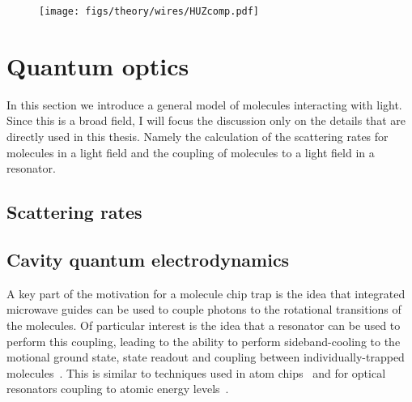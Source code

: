 \begin{figure}[htb]
  \centering
  \texttt{[image: figs/theory/wires/HUZcomp.pdf]}
  \caption{}
  \label{theory:fig:HUZ}
\end{figure}


\section{Quantum optics}
\label{theory:QO}

In this section we introduce a general model of molecules interacting with
light.  Since this is a broad field, I will focus the discussion only on the
details that are directly used in this thesis.  Namely the calculation of the
scattering rates for molecules in a light field and the coupling of molecules
to a light field in a resonator.


\subsection{Scattering rates}


\subsection{Cavity quantum electrodynamics}

A key part of the motivation for a molecule chip trap is the idea that
integrated microwave guides can be used to couple photons to the rotational
transitions of the molecules. Of particular interest is the idea
that a resonator can be used to perform this coupling, leading to the
ability to perform sideband-cooling to the motional ground state, state readout
and coupling between individually-trapped molecules~\cite{Andre2006}. This is
similar to techniques used in atom chips~\cite{Treutlein2008} and for optical
resonators coupling to atomic energy levels~\cite{SchleierSmith2011}.

